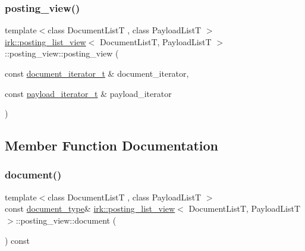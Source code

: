 \subsubsection{\texorpdfstring{posting\+\_\+view()}{posting\_view()}}
{\footnotesize\ttfamily template$<$class Document\+ListT , class Payload\+ListT $>$ \\
\mbox{\hyperlink{classirk_1_1posting__list__view}{irk\+::posting\+\_\+list\+\_\+view}}$<$ Document\+ListT, Payload\+ListT $>$\+::posting\+\_\+view\+::posting\+\_\+view (\begin{DoxyParamCaption}\item[{const \mbox{\hyperlink{classirk_1_1posting__list__view_abaca622760e6da2c67d55cf35207250f}{document\+\_\+iterator\+\_\+t}} \&}]{document\+\_\+iterator,  }\item[{const \mbox{\hyperlink{classirk_1_1posting__list__view_a5a153169348a164ea2cb1a18dc76e279}{payload\+\_\+iterator\+\_\+t}} \&}]{payload\+\_\+iterator }\end{DoxyParamCaption})\hspace{0.3cm}{\ttfamily [inline]}}



\subsection{Member Function Documentation}
\mbox{\label{classirk_1_1posting__list__view_1_1posting__view_a5f16627e37b201915b1a257b800a0105}} 
\subsubsection{\texorpdfstring{document()}{document()}}
{\footnotesize\ttfamily template$<$class Document\+ListT , class Payload\+ListT $>$ \\
const \mbox{\hyperlink{classirk_1_1posting__list__view_ac4615e6e3d8ee1eb9a847b7a34919977}{document\+\_\+type}}\& \mbox{\hyperlink{classirk_1_1posting__list__view}{irk\+::posting\+\_\+list\+\_\+view}}$<$ Document\+ListT, Payload\+ListT $>$\+::posting\+\_\+view\+::document (\begin{DoxyParamCaption}{ }\end{DoxyParamCaption}) const\hspace{0.3cm}{\ttfamily [inline]}}

